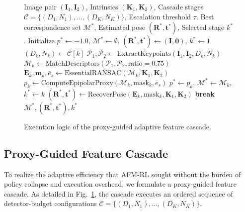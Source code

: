 \documentclass[conference]{IEEEtran}
\begin{document}
\begin{figure}[t]
\centering
\begin{algorithmic}[1]
\REQUIRE Image pair $(\mathbf{I}_1, \mathbf{I}_2)$, Intrinsics $(\mathbf{K}_1, \mathbf{K}_2)$, Cascade stages $\mathcal{C} = \{(D_1, N_1), \dots, (D_K, N_K)\}$, Escalation threshold $\tau$.
\ENSURE Best correspondence set $\mathcal{M}^*$, Estimated pose $(\mathbf{R}^*, \mathbf{t}^*)$, Selected stage $k^*$.
\STATE Initialize $p^* \leftarrow -1.0$, $\mathcal{M}^* \leftarrow \emptyset$, $(\mathbf{R}^*, \mathbf{t}^*) \leftarrow (\mathbf{I}, \mathbf{0})$, $k^* \leftarrow 1$
    \STATE $(D_k, N_k) \leftarrow \mathcal{C}[k]$
    \STATE $\mathcal{P}_1, \mathcal{P}_2 \leftarrow \text{ExtractKeypoints}(\mathbf{I}_1, \mathbf{I}_2, D_k, N_k)$
    \STATE $\mathcal{M}_k \leftarrow \text{MatchDescriptors}(\mathcal{P}_1, \mathcal{P}_2, \text{ratio}=0.75)$
    \STATE $\mathbf{E}_k, \mathbf{m}_k, \bar{e}_s \leftarrow \text{EssentialRANSAC}(\mathcal{M}_k, \mathbf{K}_1, \mathbf{K}_2)$
    \STATE $p_k \leftarrow \text{ComputeEpipolarProxy}(\mathcal{M}_k, \text{mask}_k, \bar{e}_s)$
        \STATE $p^* \leftarrow p_k$, $\mathcal{M}^* \leftarrow \mathcal{M}_k$, $k^* \leftarrow k$
        \STATE $(\mathbf{R}^*, \mathbf{t}^*) \leftarrow \text{RecoverPose}(\mathbf{E}_k, \text{mask}_k, \mathbf{K}_1, \mathbf{K}_2)$
    \ENDIF
        \STATE \textbf{break} 
    \ENDIF
\ENDFOR
\RETURN $\mathcal{M}^*, (\mathbf{R}^*, \mathbf{t}^*), k^*$
\end{algorithmic}
\caption{Execution logic of the proxy-guided adaptive feature cascade.}
\label{fig:cascade_algo}
\end{figure}

\subsection{Proxy-Guided Feature Cascade}
To realize the adaptive efficiency that AFM-RL sought without the burden of policy collapse and execution overhead, we formulate a proxy-guided feature cascade. As detailed in Fig.~\ref{fig:cascade_algo}, the cascade executes an ordered sequence of detector-budget configurations $\mathcal{C} = \{(D_1, N_1), \dots, (D_K, N_K)\}$.
\end{document}
